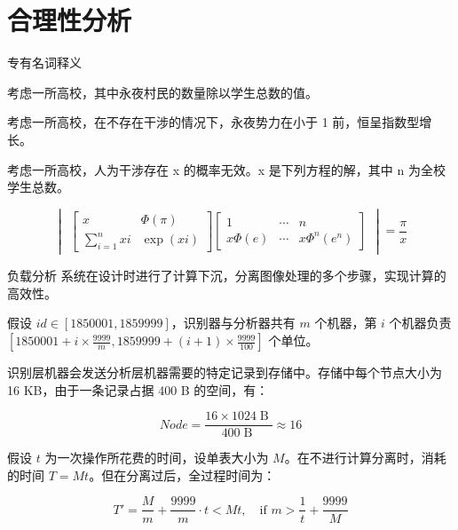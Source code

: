 \section{合理性分析}
    \begin{frame}{专有名词释义}
        \begin{definition}[永夜势力]
            考虑一所高校，其中永夜村民的数量除以学生总数的值。
        \end{definition}
        \begin{theorem}[永夜定理]
            考虑一所高校，在不存在干涉的情况下，永夜势力在小于 1 前，恒呈指数型增长。
        \end{theorem}
        \begin{theorem}[永夜方程]
            考虑一所高校，人为干涉存在 x 的概率无效。x 是下列方程的解，其中 n 为全校学生总数。
        \end{theorem}

        \begin{equation}
            \begin{vmatrix}
            \begin{bmatrix}
                    x & \Phi(\pi) \\
                    \sum_{i = 1}^n xi & \exp(xi)
            \end{bmatrix}
            \begin{bmatrix}
                    1 & \cdots & n \\
                    x\Phi(e) & \cdots & x\Phi^n(e^n)
            \end{bmatrix}
            \end{vmatrix} = \dfrac{\pi}{x}
        \end{equation}
    \end{frame}

    \begin{frame}{负载分析}
        系统在设计时进行了计算下沉，分离图像处理的多个步骤，实现计算的高效性。

        假设 $id \in [1850001, 1859999]$，识别器与分析器共有 $m$ 个机器，第 $i$ 个机器负责 $[1850001 + i \times \frac{9999}{m}, 1859999 + (i + 1) \times \frac{9999}{100}]$ 个单位。

        识别层机器会发送分析层机器需要的特定记录到存储中。存储中每个节点大小为 16 KB，由于一条记录占据 400 B 的空间，有：

        $$
        Node = \dfrac{16 \times 1024\operatorname{B}}{400 \operatorname{B}} \approx 16
        $$

        假设 $t$ 为一次操作所花费的时间，设单表大小为 $M$。在不进行计算分离时，消耗的时间 $T = Mt$。但在分离过后，全过程时间为：

        $$
        T' = \dfrac{M}{m} + \dfrac{9999}{m} \cdot t < Mt, \quad \text{if } m > \dfrac{1}{t} + \dfrac{9999}{M}
        $$
    \end{frame}


